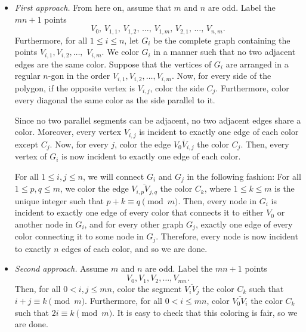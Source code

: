 \begin{itemize}
    \item \textit{First approach.} From here on, assume that $m$ and $n$ are odd. Label the $mn+1$ points \[V_0,\,V_{1,1},\,V_{1,2},\,\ldots,\,V_{1,m},\,V_{2,1},\,\ldots,\,V_{n,m}.\]
        Furthermore, for all $1\le i\le n$, let $G_i$ be the complete graph containing the points $V_{i,1},V_{i,2},\ldots,$ $V_{i,m}$. We color $G_i$ in a manner such that no two adjacent edges are the same color. Suppose that the vertices of $G_i$ are arranged in a regular $n$-gon in the order $V_{i,1},V_{i,2},\ldots,V_{i,m}$. Now, for every side of the polygon, if the opposite vertex is $V_{i,j}$, color the side $C_j$. Furthermore, color every diagonal the same color as the side parallel to it.

        Since no two parallel segments can be adjacent, no two adjacent edges share a color. Moreover, every vertex $V_{i,j}$ is incident to exactly one edge of each color except $C_j$. Now, for every $j$, color the edge $\overline{V_0V_{i,j}}$  the color $C_j$. Then, every vertex of $G_i$ is now incident to exactly one edge of each color.

        For all $1\le i,j\le n$, we will connect $G_i$ and $G_j$ in the following fashion: For all $1\le p,q\le m$, we color the edge $\overline{V_{i,p}V_{j,q}}$ the color $C_k$, where $1\le k\le m$ is the unique integer such that $p+k\equiv q\pmod{m}$. Then, every node in $G_i$ is incident to exactly one edge of every color that connects it to either $V_0$ or another node in $G_i$, and for every other graph $G_j$, exactly one edge of every color connecting it to some node in $G_j$. Therefore, every node is now incident to exactly $n$ edges of each color, and so we are done.

    \item \textit{Second approach.} Assume $m$ and $n$ are odd. Label the $mn+1$ points \[V_0,V_1,V_2,\ldots,V_{mn}.\]
        Then, for all $0<i,j\le mn$, color the segment $\overline{V_iV_j}$ the color $C_k$ such that $i+j\equiv k\pmod{m}$. Furthermore, for all $0<i\le mn$, color $\overline{V_0V_i}$ the color $C_k$ such that $2i\equiv k\pmod{m}$. It is easy to check that this coloring is fair, so we are done.
\end{itemize}

